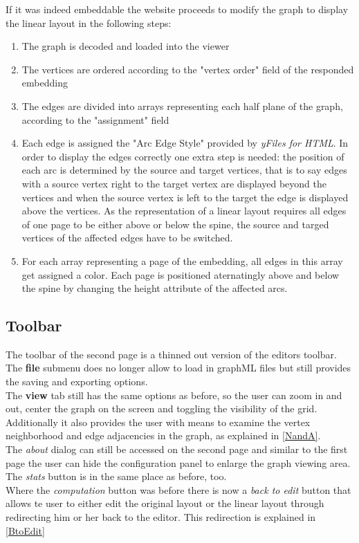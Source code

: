 \noindent If it was indeed embeddable the website proceeds to modify the graph to display the linear layout in the following steps:
\begin{enumerate}
\item The graph is decoded and loaded into the viewer
\item The vertices are ordered according to the "vertex order" field of the responded embedding
\item The edges are divided into arrays representing each half plane of the graph, according to the "assignment" field\\
\item Each edge is assigned the "Arc Edge Style" provided by \textit{yFiles for HTML}. In order to display the edges correctly one extra step is needed: the position of each arc is determined by the source and target vertices, that is to say edges with a source vertex right to the target vertex are displayed beyond the vertices and when the source vertex is left to the target the edge is displayed above the vertices. As the representation of a linear layout requires all edges of one page to be either above or below the spine, the source and targed vertices of the affected edges have to be switched.
\item For each array representing a page of the embedding, all edges in this array get assigned a color. Each page is positioned aternatingly above and below the spine by changing the height attribute of the affected arcs.\\
\end{enumerate}
\subsection{Toolbar}
The toolbar of the second page is a thinned out version of the editors toolbar.\\[12pt]
The \textbf{file} submenu does no longer allow to load in graphML files but still provides the saving and exporting options.\\[12pt]
The \textbf{view} tab still has the same options as before, so the user can zoom in and out, center the graph on the screen and toggling the visibility of the grid.\\
Additionally it also provides the user with means to examine the vertex neighborhood and edge adjacencies in the graph, as explained in \autoref{NandA}.\\
The \textit{about} dialog can still be accessed on the second page and similar to the first page the user can hide the configuration panel to enlarge the graph viewing area. The \textit{stats} button is in the same place as before, too.\\
Where the \textit{computation} button was before there is now a \textit{back to edit} button that allows te user to either edit the original layout or the linear layout through redirecting him or her back to the editor. This redirection is explained in \autoref{BtoEdit}\\
